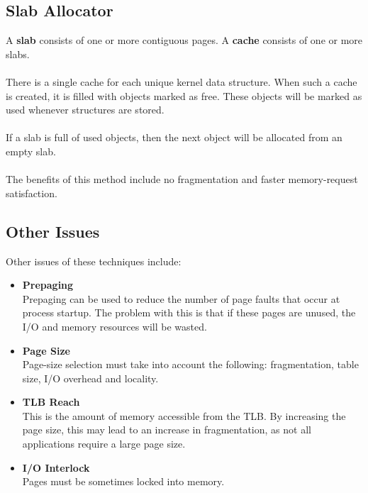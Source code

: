 \documentclass{article}
\begin{document}
\subsection{Slab Allocator}
A \textbf{slab} consists of one or more contiguous pages. A \textbf{cache} consists of one or more slabs. \\ \\
There is a single cache for each unique kernel data structure. When such a cache is created, it is filled with objects marked as free. These objects will be marked as used whenever structures are stored. \\ \\
If a slab is full of used objects, then the next object will be allocated from an empty slab. \\ \\
The benefits of this method include no fragmentation and faster memory-request satisfaction.

\subsection{Other Issues}
Other issues of these techniques include:

\begin{itemize}
	\item \textbf{Prepaging}
	\vspace{.2cm} \\
	Prepaging can be used to reduce the number of page faults that occur at process startup. The problem with this is that if these pages are unused, the I/O and memory resources will be wasted.
	
	\item \textbf{Page Size}
	\vspace{.2cm} \\
	Page-size selection must take into account the following: fragmentation, table size, I/O overhead and locality.
	
	\item \textbf{TLB Reach}
	\vspace{.2cm} \\
	This is the amount of memory accessible from the TLB. By increasing the page size, this may lead to an increase in fragmentation, as not all applications require a large page size.
	
	\item \textbf{I/O Interlock}
	\vspace{.2cm} \\
	Pages must be sometimes locked into memory.
\end{itemize}
\end{document}
